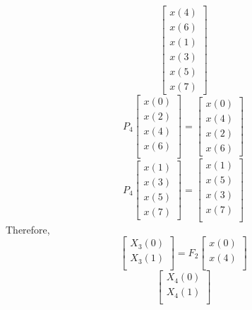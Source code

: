 \documentclass[journal,12pt,twocolumn]{IEEEtran}
\renewcommand\thesection{\arabic{section}}
\begin{document}
\begin{enumerate}[label=\thesection.\arabic*
	,ref=\thesection.\theenumi]
\begin{enumerate}[label=\arabic*.,ref=\thesection.\theenumi]
\begin{equation}
\begin{bmatrix}
			x(4) \\ 
			x(6) \\
			x(1) \\ 
			x(3) \\ 
			x(5) \\
			x(7)
		\end{bmatrix}
	\end{equation}
	\begin{equation}
		P_{4}
		\begin{bmatrix}
			x(0) \\ 
			x(2) \\ 
			x(4) \\ 
			x(6) \\
		\end{bmatrix}
		= 
		\begin{bmatrix}
			x(0) \\ 
			x(4) \\ 
			x(2) \\
			x(6)
		\end{bmatrix}
	\end{equation}
	\begin{equation}
		P_{4}
		\begin{bmatrix}
			x(1) \\ 
			x(3) \\ 
			x(5) \\
			x(7)
		\end{bmatrix}
		= 
		\begin{bmatrix}
			x(1) \\ 
			x(5) \\ 
			x(3) \\ 
			x(7) \\
		\end{bmatrix}
	\end{equation}
	Therefore,
	\begin{equation}
		\begin{bmatrix}
			X_{3}(0) \\ 
			X_{3}(1)\\ 
		\end{bmatrix}
		= F_{2}
		\begin{bmatrix}
			x(0) \\ 
			x(4) \\ 
		\end{bmatrix}
	\end{equation}
	\begin{equation}
		\begin{bmatrix}
			X_{4}(0) \\ 
			X_{4}(1)\\ 

\end{bmatrix}
\end{equation}
\end{enumerate}
\end{enumerate}
\end{document}
